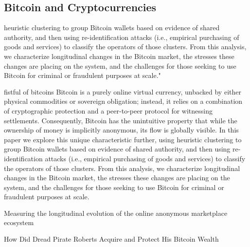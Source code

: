 \subsection{Bitcoin and Cryptocurrencies}

\cite{bonneau2014mixcoin, ron2014did}


 heuristic clustering to group Bitcoin wallets based on evidence of shared authority, and then using re-identification attacks (i.e., empirical purchasing of goods and services) to classify the operators of those clusters. From this analysis, we characterize longitudinal changes in the Bitcoin market, the stresses these changes are placing on the system, and the challenges for those seeking to use Bitcoin for criminal or fraudulent purposes at scale." 

\cite{meiklejohn2013fistful}
fistful of bitcoins
Bitcoin is a purely online virtual currency, unbacked by either physical commodities or sovereign obligation; instead, it relies on a combination of cryptographic protection and a peer-to-peer protocol for witnessing settlements. Consequently, Bitcoin has the unintuitive property that while the ownership of money is implicitly anonymous, its flow is globally visible. In this paper we explore this unique characteristic further, using heuristic clustering to group Bitcoin wallets based on evidence of shared authority, and then using re-identification attacks (i.e., empirical purchasing of goods and services) to classify the operators of those clusters. From this analysis, we characterize longitudinal changes in the Bitcoin market, the stresses these changes are placing on the system, and the challenges for those seeking to use Bitcoin for criminal or fraudulent purposes at scale.

\cite{soska2015measuring}
Measuring the longitudinal evolution of the online anonymous marketplace ecosystem

\cite{ron2014did}
How Did Dread Pirate Roberts Acquire and Protect His Bitcoin Wealth

